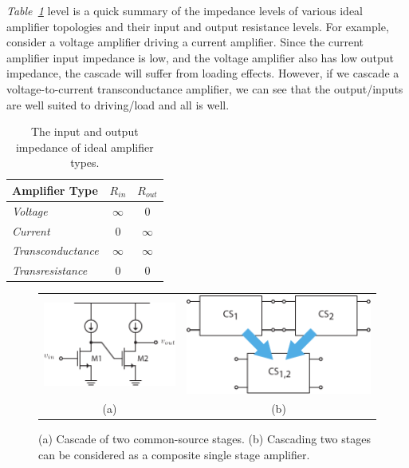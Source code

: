\emph{Table~\ref{tab:imp}} level is a quick summary of the impedance levels of various ideal amplifier topologies and their input and output resistance levels.  For example, consider a voltage amplifier driving a current amplifier.  Since the current amplifier input impedance is low, and the voltage amplifier also has low output impedance, the cascade will suffer from loading effects.  However, if we cascade a voltage-to-current transconductance amplifier, we can see that the output/inputs are well suited to driving/load and all is well.
\begin{table}[H]
\centering
\setlength{\tabcolsep}{20pt}
\renewcommand{\arraystretch}{1.5}
\begin{tabular}{|l|c|c|}
    \hline
    \textbf{Amplifier Type}  &  $R_{in}$ &  $R_{out}$\\
    \hline
    \textit{Voltage} & $\infty$ & $0$\\
    \hline
    \textit{Current} & $0$  &  $\infty$\\
    \hline
    \textit{Transconductance} & $\infty$ & $\infty$\\
    \hline
    \textit{Transresistance} & $0$ & $0$\\
    \hline
\end{tabular}
\caption{The input and output impedance of ideal amplifier types.
\label{tab:imp}} 
\end{table}
\newpage
\begin{figure}[t]
\centering
\begin{tabular}{cc}
\includegraphics[scale=1]{cs_cascade_sch} &
\includegraphics[width=.5\columnwidth]{1cascade}\\
(a) & (b)\\
\end{tabular}
\caption{(a) Cascade of two common-source stages.  (b) Cascading two stages can be considered as a composite single stage amplifier.}
\label{fig:1cascade}
\end{figure}
